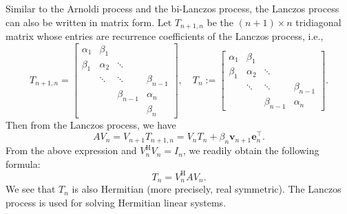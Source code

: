 {Similar to the Arnoldi process and the bi-Lanczos process, the Lanczos process can also be written in matrix form. Let $T_{n+1,n}$ be the $(n+1)\times n$ tridiagonal matrix whose entries are recurrence coefficients of the Lanczos process, i.e.,}
\[
T_{n+1,n}=\begin{bmatrix}\alpha_1&\beta_1&&\\\beta_1&\alpha_2&\ddots&\\&\ddots&\ddots&\beta_{n-1}\\&&\beta_{n-1}&\alpha_n\\&&&\beta_n\end{bmatrix},\quad
T_n:=\begin{bmatrix}\alpha_1&\beta_1&&\\\beta_1&\alpha_2&\ddots&\\&\ddots&\ddots&\beta_{n-1}\\&&\beta_{n-1}&\alpha_n\end{bmatrix}.
\]
{Then from the Lanczos process, we have}
\begin{equation}\label{eq:lanczos-matrix-relation}
AV_n=V_{n+1}T_{n+1,n}=V_nT_n+\beta_n\bm v_{n+1}\bm e_n^\top.
\end{equation}
{From the above expression and $V_n^{\mathrm H}V_n=I_n$, we readily obtain the following formula:}
\begin{equation}\label{eq:lanczos-projected-matrix}
T_n=V_n^{\mathrm H}AV_n.
\end{equation}
{We see that $T_n$ is also Hermitian (more precisely, real symmetric). The Lanczos process is used for solving Hermitian linear systems.}
